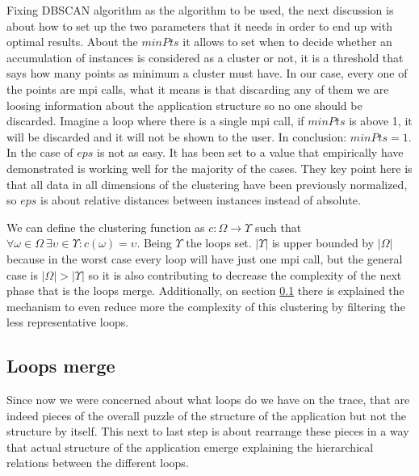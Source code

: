 Fixing DBSCAN algorithm as the algorithm to be used, the next discussion is
about how to set up the two parameters that it needs in order to end up with
optimal results. About the $minPts$ it allows to set when to decide whether an
accumulation of instances is considered as a cluster or not, it is a threshold
that says how many points as minimum a cluster must have. In our case, every one
of the points are mpi calls, what it means is that discarding any of them we are
loosing information about the application structure so no one should be
discarded. Imagine a loop where there is a single mpi call, if $minPts$ is above
1, it will be discarded and it will not be shown to the user. In conclusion:
$minPts=1$. In the case of $eps$ is not as easy. It has been set to a value that
empirically have demonstrated is working well for the majority of the cases. 
They key point here is that all data in all dimensions of the clustering have been 
previously normalized, so $eps$ is about relative distances between instances
instead of absolute.

We can define the clustering function as $c : \Omega \rightarrow \Upsilon$ such
that $\forall \omega \in \Omega \medspace \exists \upsilon \in \Upsilon :
c(\omega) = \upsilon$. Being $\Upsilon$ the loops set. $|\Upsilon|$ is upper
bounded by $|\Omega|$ because in the worst case every loop will have just one
mpi call, but the general case is $|\Omega| > |\Upsilon|$ so it is also
contributing to decrease the complexity of the next phase that is the loops
merge. Additionally, on section \ref{ss:loops_merge} there is explained the 
mechanism to even reduce more the complexity of this clustering by filtering
the less representative loops.

\subsection{Loops merge}\label{ss:loops_merge}

Since now we were concerned about what loops do we have on the trace, that are
indeed pieces of the overall puzzle of the structure of the application but not
the structure by itself. This next to last step is about rearrange these pieces 
in a way that actual structure of the application emerge explaining the 
hierarchical relations between the different loops. 


